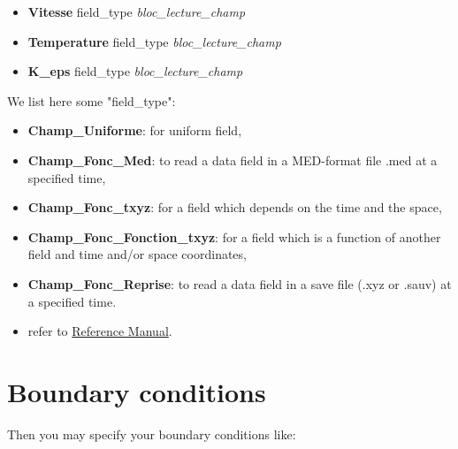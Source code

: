 \begin{itemize}
\item \textbf{Vitesse}      field\_type   \textit{bloc\_lecture\_champ}
\item \textbf{Temperature}  field\_type   \textit{bloc\_lecture\_champ}
\item \textbf{K\_eps}       field\_type   \textit{bloc\_lecture\_champ}
\end{itemize}

We list here some "field\_type":
\begin{itemize}
\item \textbf{Champ\_Uniforme}: for uniform field,
\item \textbf{Champ\_Fonc\_Med}: to read a data field in a MED-format file .med at a specified time,
\item \textbf{Champ\_Fonc\_txyz}: for a field which depends on the time and the space,
\item \textbf{Champ\_Fonc\_Fonction\_txyz}: for a field which is a function of another field and time and/or space coordinates,
\item \textbf{Champ\_Fonc\_Reprise}: to read a data field in a save file (.xyz or .sauv) at a specified time.
\item refer to \href{TRUST_Reference_Manual.pdf\#fieldbase}{\trust Reference Manual}.
\end{itemize}




\section{Boundary conditions}

Then you may specify your boundary conditions like:

    \begin{center}
    \end{center}

